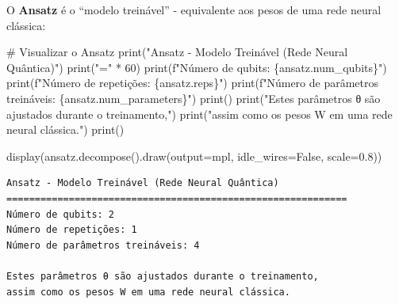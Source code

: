 \documentclass[
  brazilian,
]{report}
\newenvironment{Shaded}{\begin{snugshade}}{\end{snugshade}}
\newcommand{\NormalTok}[1]{\textcolor[rgb]{0.00,0.23,0.31}{#1}}
\begin{document}
O \textbf{Ansatz} é o ``modelo treinável'' - equivalente aos pesos de
uma rede neural clássica:

\begin{Shaded}
\begin{Highlighting}[]

\NormalTok{\# Visualizar o Ansatz}
\NormalTok{print("Ansatz {-} Modelo Treinável (Rede Neural Quântica)")}
\NormalTok{print("=" * 60)}
\NormalTok{print(f"Número de qubits: \{ansatz.num\_qubits\}")}
\NormalTok{print(f"Número de repetições: \{ansatz.reps\}")}
\NormalTok{print(f"Número de parâmetros treináveis: \{ansatz.num\_parameters\}")}
\NormalTok{print()}
\NormalTok{print("Estes parâmetros θ são ajustados durante o treinamento,")}
\NormalTok{print("assim como os pesos W em uma rede neural clássica.")}
\NormalTok{print()}

\NormalTok{display(ansatz.decompose().draw(output=\textquotesingle{}mpl\textquotesingle{}, idle\_wires=False, scale=0.8))}
\end{Highlighting}
\end{Shaded}

\begin{verbatim}
Ansatz - Modelo Treinável (Rede Neural Quântica)
============================================================
Número de qubits: 2
Número de repetições: 1
Número de parâmetros treináveis: 4

Estes parâmetros θ são ajustados durante o treinamento,
assim como os pesos W em uma rede neural clássica.
\end{verbatim}
\end{document}
